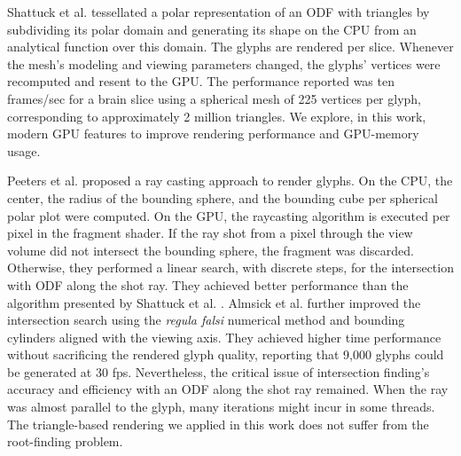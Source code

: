 \documentclass[twoside,twocolumn,10pt]{article}
\begin{document}
Shattuck et al. \cite{shattuck2008} tessellated a polar representation of an ODF with triangles by subdividing its polar domain and generating its shape on the CPU from an analytical function over this domain. The glyphs are rendered per slice. Whenever the mesh's modeling and viewing parameters changed, the glyphs' vertices were recomputed and resent to the GPU. The performance reported was ten frames/sec for a brain slice using a spherical mesh of 225 vertices per glyph, corresponding to approximately 2 million triangles. We explore, in this work, modern GPU features to improve rendering performance and GPU-memory usage. %




Peeters et al. \cite{peeters2009} proposed a ray casting approach to render glyphs. On the CPU, the center, the radius of the bounding sphere, and the bounding cube per spherical polar plot were computed. On the GPU, the raycasting algorithm is executed per pixel in the fragment shader. If the ray shot from a pixel through the view volume did not intersect the bounding sphere, the fragment was discarded. Otherwise, they performed a linear search, with discrete steps, for the intersection with ODF along the shot ray. They achieved better performance than the algorithm presented by Shattuck et al. \cite{shattuck2008}. Almsick et al. \cite{almsick2011} further improved the intersection search using the \textit{regula falsi} numerical method and bounding cylinders aligned with the viewing axis. They achieved higher time performance without sacrificing the rendered glyph quality, reporting that 9,000 glyphs could be generated at 30 fps. Nevertheless, the critical issue of intersection finding's accuracy and efficiency with an ODF along the shot ray remained. When the ray was almost parallel to the glyph, many iterations might incur in some threads. The triangle-based rendering we applied in this work does not suffer from the root-finding problem.
\end{document}
